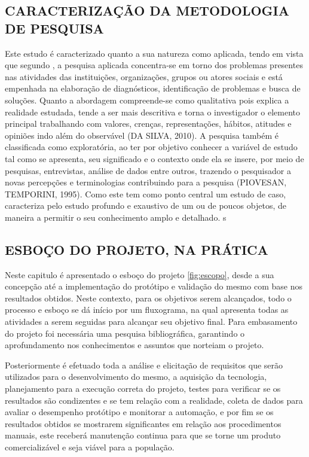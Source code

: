 \documentclass[%
  article,%
  a4paper,%
  12pt,%
  fleqn,%
  oneside,%
  chapter = TITLE,%
  section = TITLE,%
]{abntex2}
\begin{document}
\subsection{CARACTERIZAÇÃO DA METODOLOGIA DE PESQUISA}

Este estudo é caracterizado quanto a sua natureza como aplicada, tendo em vista que segundo \citet{thiollent1985metodologia}, a pesquisa aplicada concentra-se em torno dos problemas presentes nas atividades das instituições, organizações, grupos ou atores sociais e está empenhada na elaboração de diagnósticos, identificação de problemas e busca de soluções.
Quanto a abordagem compreende-se como qualitativa  pois explica a realidade estudada, tende a ser mais descritiva e torna o investigador o elemento principal trabalhando com valores, crenças, representações, hábitos, atitudes e opiniões indo além do observável (DA SILVA, 2010).
A pesquisa também é classificada como exploratória, ao ter por objetivo conhecer a variável de estudo tal como se apresenta, seu significado e o contexto onde ela se insere, por meio de pesquisas, entrevistas, análise de dados entre outros, trazendo o pesquisador a novas percepções e terminologias contribuindo para a pesquisa (PIOVESAN, TEMPORINI, 1995).
  Como este tem como ponto central um estudo de caso, \citet{Gil2008}  caracteriza pelo estudo profundo e exaustivo de um ou de poucos objetos, de maneira a permitir o seu conhecimento amplo e detalhado.
s

\subsection{ESBOÇO DO PROJETO, NA PRÁTICA}

Neste capitulo é apresentado o esboço do projeto \cref{fig:escopo}, desde a sua concepção até a implementação do protótipo e validação do mesmo com base nos resultados obtidos. Neste contexto, para os objetivos serem alcançados, todo o processo e esboço se dá início por um fluxograma, na qual apresenta todas as atividades a serem seguidas para alcançar seu objetivo final. Para embasamento do projeto foi necessária uma pesquisa bibliográfica, garantindo o aprofundamento nos conhecimentos e assuntos que norteiam o projeto.

Posteriormente é efetuado toda a análise e elicitação de requisitos que serão utilizados para o desenvolvimento do mesmo, a aquisição da tecnologia, planejamento para a execução correta do projeto, testes para verificar se os resultados são condizentes e se tem relação com a realidade, coleta de dados para avaliar o desempenho protótipo e monitorar a automação, e por fim se os resultados obtidos se mostrarem significantes em relação aos procedimentos manuais, este receberá manutenção continua para que se torne um produto comercializável e seja viável para a população. 
\end{document}
